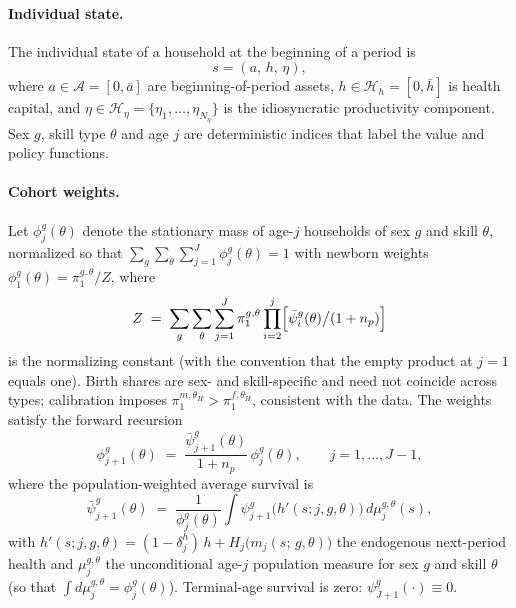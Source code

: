 \documentclass[12pt,a4paper]{article}
\begin{document}
\paragraph{Individual state.}
The individual state of a household at the beginning of a period is
\begin{equation}
\label{eq:state}
s = (a,\, h,\, \eta),
\end{equation}
where $a \in \mathcal{A} = [0, \bar{a}]$ are beginning-of-period assets, $h \in \mathcal{H}_h = [0, \bar{h}]$ is health capital, and $\eta \in \mathcal{H}_\eta = \{\eta_1, \ldots, \eta_{N_\eta}\}$ is the idiosyncratic productivity component. Sex $g$, skill type $\theta$ and age $j$ are deterministic indices that label the value and policy functions.

\paragraph{Cohort weights.}
Let $\phi_j^{g}(\theta)$ denote the stationary mass of age-$j$ households of sex $g$ and skill $\theta$, normalized so that $\sum_g \sum_\theta \sum_{j=1}^{J} \phi_{j}^{g}(\theta) = 1$ with newborn weights $\phi_{1}^{g}(\theta) = \pi^{g,\theta}_1 / Z$, where
\[
Z \;=\; \sum_{g}\sum_{\theta}\sum_{j=1}^{J} \pi^{g,\theta}_1 \prod_{i=2}^{j} \Bigl[\bar\psi_i^{g}(\theta) \big/ (1+n_p)\Bigr]
\]
is the normalizing constant (with the convention that the empty product at $j=1$ equals one). Birth shares are sex- and skill-specific and need not coincide across types; calibration imposes $\pi^{m,\theta_H}_1 > \pi^{f,\theta_H}_1$, consistent with the data. The weights satisfy the forward recursion
\begin{equation}
\label{eq:cohort_weights}
\phi_{j+1}^{g}(\theta) \;=\; \frac{\bar{\psi}_{j+1}^{g}(\theta)}{1 + n_p}\, \phi_{j}^{g}(\theta), \qquad j = 1, \ldots, J-1,
\end{equation}
where the population-weighted average survival is
\begin{equation}
\label{eq:avg_survival}
\bar{\psi}_{j+1}^{g}(\theta)
\;=\;
\frac{1}{\phi_{j}^{g}(\theta)} \int \psi_{j+1}^{g}\bigl(h'(s; j, g, \theta)\bigr)\, d\mu_j^{g,\theta}(s),
\end{equation}
with $h'(s; j, g, \theta) = (1-\delta_j^h)\, h + H_j\bigl(m_j(s;\, g, \theta)\bigr)$ the endogenous next-period health and $\mu_{j}^{g,\theta}$ the unconditional age-$j$ population measure for sex $g$ and skill $\theta$ (so that $\int d\mu_{j}^{g,\theta} = \phi_{j}^{g}(\theta)$). Terminal-age survival is zero: $\psi_{J+1}^{g}(\cdot) \equiv 0$.
\end{document}
